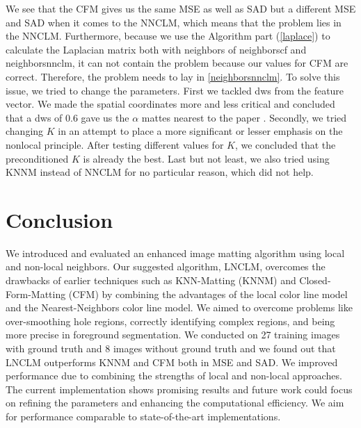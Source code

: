 We see that the CFM gives us the same MSE as well as SAD but a different MSE and SAD when it comes to the NNCLM, which means that the problem lies in the NNCLM. Furthermore, because we use the Algorithm part (\ref{laplace}) to calculate the Laplacian matrix both with neighbors of neighborscf and neighborsnnclm, it can not contain the problem because our values for CFM are correct. Therefore, the problem needs to lay in \ref{neighborsnnclm}. To solve this issue, we tried to change the parameters. First we tackled dws from the feature vector. We made the spatial coordinates more and less critical and concluded that a dws of \(0.6\) gave us the \(\alpha\) mattes nearest to the paper \cite{lnclm}. Secondly, we tried changing \(K\) in an attempt to place a more significant or lesser emphasis on the nonlocal principle. After testing different values for \(K\), we concluded that the preconditioned \(K\) is already the best. Last but not least, we also tried using KNNM instead of NNCLM for no particular reason, which did not help. 





\section{Conclusion}
We introduced and evaluated an enhanced image matting algorithm using local and non-local neighbors. Our suggested algorithm, LNCLM, overcomes the drawbacks of earlier techniques such as KNN-Matting (KNNM) and Closed-Form-Matting (CFM) by combining the advantages of the local color line model and the Nearest-Neighbors color line model.
We aimed to overcome problems like over-smoothing hole regions, correctly identifying complex regions, and being more precise in foreground segmentation. 
We conducted on 27 training images with ground truth and 8 images without ground truth and we found out that LNCLM outperforms KNNM and CFM both in MSE and SAD. We improved performance due to combining the strengths of local and non-local approaches.
The current implementation shows promising results and future work could focus on refining the parameters and enhancing the computational efficiency. We aim for performance comparable to state-of-the-art implementations.



